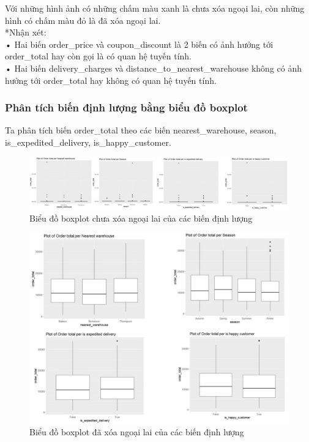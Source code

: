 Với những hình ảnh có những chấm màu xanh là chưa xóa ngoại lai, còn những hình có chấm màu đỏ là đã xóa ngoại lai. \\
*Nhận xét: \\
•	Hai biến order\_price và coupon\_discount là 2 biến có ảnh hưởng tới order\_total hay còn gọi là có quan hệ tuyến tính.\\
•	Hai biến delivery\_charges và distance\_to\_nearest\_warehouse không có ảnh hưởng tới order\_total hay không có quan hệ tuyến tính.
\subsubsection{Phân tích biến định lượng bằng biểu đồ boxplot}
Ta phân tích biến order\_total theo các biến nearest\_warehouse, season, is\_expedited\_delivery, is\_happy\_customer.
\begin{figure}[H]
    \centering
    \includegraphics[width=1\linewidth]{graphics/bang13.jpg}
    \caption{Biểu đồ boxplot chưa xóa ngoại lai của các biến định lượng}
    
\end{figure}
\begin{figure}[H]
    \centering
    \includegraphics[width=1\linewidth]{graphics/bang14.jpg}
    \caption{Biểu đồ boxplot đã xóa ngoại lai của các biến định lượng}
    
\end{figure}
